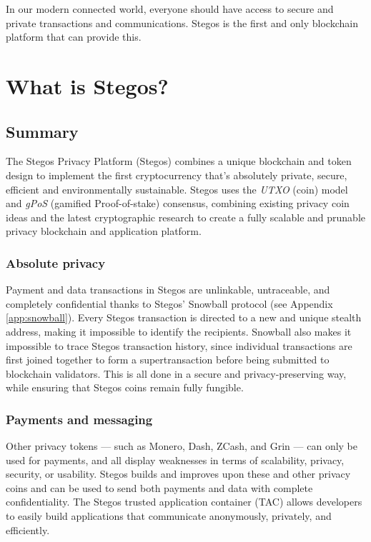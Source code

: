 \documentclass[8pt,fleqn,openany]{book}
\begin{document}
In our modern connected world, everyone should have access to secure and private transactions and communications. Stegos is the first and only blockchain platform that can provide this.  
	
\chapter{What is Stegos?}\label{chap:what-is-stegos}

\section{Summary}
The Stegos Privacy Platform (Stegos) combines a unique blockchain and token design to implement the first cryptocurrency that’s absolutely private, secure, efficient and environmentally sustainable. Stegos uses the \textit{UTXO} (coin) model and \textit{gPoS} (gamified Proof-of-stake) consensus, combining existing privacy coin ideas and the latest cryptographic research to create a fully scalable and prunable privacy blockchain and application platform. 
 
\subsection{Absolute privacy}
Payment and data transactions in Stegos are unlinkable, untraceable, and completely confidential thanks to Stegos' Snowball protocol (see Appendix \ref{app:snowball}). Every Stegos transaction is directed to a new and unique stealth address, making it impossible to identify the recipients. Snowball also makes it impossible to trace Stegos transaction history, since individual transactions are first joined together to form a supertransaction before being submitted to blockchain validators. This is all done in a secure and privacy-preserving way, while ensuring that Stegos coins remain fully fungible.

\subsection{Payments and messaging}
Other privacy tokens — such as Monero, Dash, ZCash, and Grin — can only be used for payments, and all display weaknesses in terms of scalability, privacy, security, or usability. Stegos builds and improves upon these and other privacy coins and can be used to send both payments and data with complete confidentiality. The Stegos trusted application container (TAC) allows developers to easily build applications that communicate anonymously, privately, and efficiently.
\end{document}
